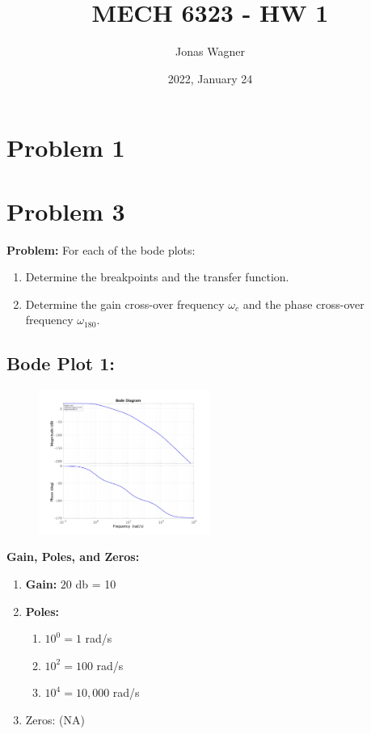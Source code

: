 \documentclass[letter]{article}
\title{MECH 6323 - HW 1}
\author{Jonas Wagner}
\date{2022, January 24}
\numberwithin{equation}{section}
\begin{document}
	

\maketitle


\section{Problem 1}









\newpage
\section{Problem 3}
\textbf{Problem:}
For each of the bode plots:
\begin{enumerate}
	\item Determine the breakpoints and the transfer function.
	\item Determine the gain cross-over frequency $\omega_c$ and the phase cross-over frequency $\omega_{180}$.
\end{enumerate}

\subsection{Bode Plot 1:}
\begin{figure}[h]
	\centering
	\includegraphics[width=0.5\textwidth]{figs/pblm3a.jpg}
\end{figure}

\textbf{Gain, Poles, and Zeros:}
\begin{enumerate}
	\item \textbf{Gain:}  $20$ db = 10
	\item \textbf{Poles:}
	\begin{enumerate}
		\item $10^{0} = 1$ rad/s
		\item $10^{2} = 100$ rad/s
		\item $10^{4} = 10,000$ rad/s
	\end{enumerate}
	\item Zeros: (NA)
\end{enumerate}
\end{document}
